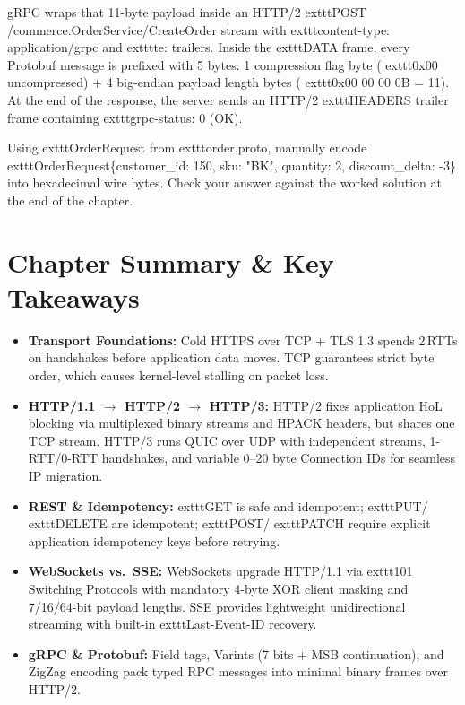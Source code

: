 gRPC wraps that 11-byte payload inside an HTTP/2 	exttt{POST /commerce.OrderService/CreateOrder} stream with 	exttt{content-type: application/grpc} and 	exttt{te: trailers}. Inside the 	exttt{DATA} frame, every Protobuf message is prefixed with 5 bytes: 1 compression flag byte (	exttt{0x00} uncompressed) + 4 big-endian payload length bytes (	exttt{0x00 00 00 0B} = 11). At the end of the response, the server sends an HTTP/2 	exttt{HEADERS} trailer frame containing 	exttt{grpc-status: 0} (OK).

\begin{tryityourselfbox}
Using 	exttt{OrderRequest} from 	exttt{order.proto}, manually encode 	exttt{OrderRequest\{customer\_id: 150, sku: "BK", quantity: 2, discount\_delta: -3\}} into hexadecimal wire bytes. Check your answer against the worked solution at the end of the chapter.
\end{tryityourselfbox}

\section{Chapter Summary \protect\& Key Takeaways}

\begin{itemize}[leftmargin=15pt]
  \item \textbf{Transport Foundations:} Cold HTTPS over TCP + TLS 1.3 spends 2\,RTTs on handshakes before application data moves. TCP guarantees strict byte order, which causes kernel-level stalling on packet loss.
  \item \textbf{HTTP/1.1 $\rightarrow$ HTTP/2 $\rightarrow$ HTTP/3:} HTTP/2 fixes application HoL blocking via multiplexed binary streams and HPACK headers, but shares one TCP stream. HTTP/3 runs QUIC over UDP with independent streams, 1-RTT/0-RTT handshakes, and variable 0--20 byte Connection IDs for seamless IP migration.
  \item \textbf{REST \& Idempotency:} 	exttt{GET} is safe and idempotent; 	exttt{PUT}/	exttt{DELETE} are idempotent; 	exttt{POST}/	exttt{PATCH} require explicit application idempotency keys before retrying.
  \item \textbf{WebSockets vs.\ SSE:} WebSockets upgrade HTTP/1.1 via 	exttt{101 Switching Protocols} with mandatory 4-byte XOR client masking and 7/16/64-bit payload lengths. SSE provides lightweight unidirectional streaming with built-in 	exttt{Last-Event-ID} recovery.
  \item \textbf{gRPC \& Protobuf:} Field tags, Varints (7 bits + MSB continuation), and ZigZag encoding pack typed RPC messages into minimal binary frames over HTTP/2.
\end{itemize}

